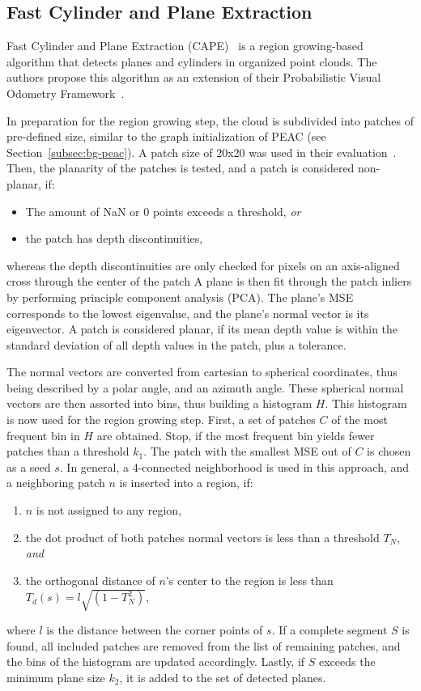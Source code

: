 \documentclass[main.tex]{subfiles}
\begin{document}
\subsection{Fast Cylinder and Plane Extraction}
\label{subsec:bg-cape}
Fast Cylinder and Plane Extraction (CAPE)~\cite{Proença_Gao_2018} is a region growing-based algorithm that detects
planes and cylinders in organized point clouds.
The authors propose this algorithm as an extension of their Probabilistic Visual Odometry Framework~\cite{Proenca_Gao_2018}.

In preparation for the region growing step, the cloud is subdivided into patches of pre-defined size, similar to
the graph initialization of PEAC (see Section~\ref{subsec:bg-peac}).
A patch size of 20x20 was used in their evaluation~\cite[Section~V.A]{Proença_Gao_2018}.
Then, the planarity of the patches is tested, and a patch is considered non-planar, if:
\begin{itemize}
    \item The amount of NaN or 0 points exceeds a threshold, \textit{or}
    \item the patch has depth discontinuities,
\end{itemize}
whereas the depth discontinuities are only checked for pixels on an axis-aligned cross through the center of the patch
A plane is then fit through the patch inliers by performing principle component analysis (PCA). The plane's MSE
corresponds to the lowest eigenvalue, and the plane's normal vector is its eigenvector.
A patch is considered planar, if its mean depth value is within the standard deviation of all depth values in the patch, plus a tolerance.

The normal vectors are converted from cartesian to spherical coordinates, thus being described by a polar angle, and
an azimuth angle. These spherical normal vectors are then assorted into bins, thus building a histogram $H$.
This histogram is now used for the region growing step.
First, a set of patches $C$ of the most frequent bin in $H$ are obtained. Stop, if the most frequent bin
yields fewer patches than a threshold $k_1$. The patch with the smallest MSE out of $C$ is chosen as a seed $s$.
In general, a 4-connected neighborhood is used in this approach, and a neighboring patch $n$ is inserted into a region, if:
\begin{enumerate}
    \item $n$ is not assigned to any region,
    \item the dot product of both patches normal vectors is less than a threshold $T_N$, \textit{and}
    \item the orthogonal distance of $n$'s center to the region is less than $T_d(s) = l\sqrt{(1-T_N^2)}$,
\end{enumerate}
where $l$ is the distance between the corner points of $s$.
If a complete segment $S$ is found, all included patches are removed from the list of remaining patches, and
the bins of the histogram are updated accordingly. Lastly, if $S$ exceeds the minimum plane size $k_2$, it is added
to the set of detected planes.
\end{document}
